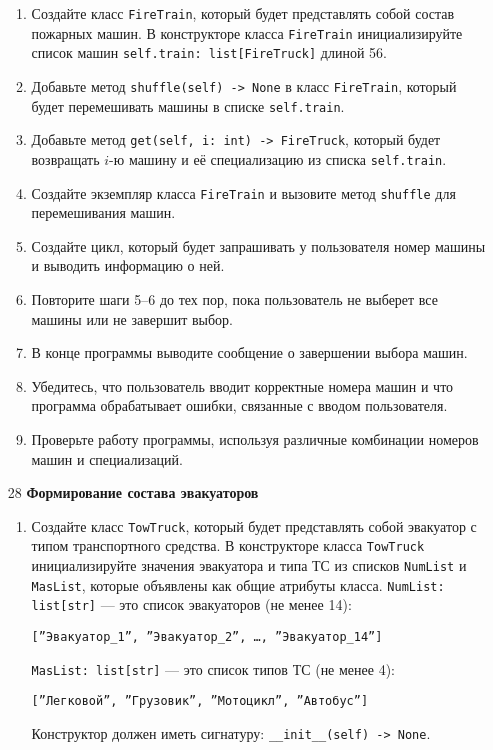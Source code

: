 \begin{enumerate}
\begin{enumerate}
    \item Создайте класс \texttt{FireTrain}, который будет представлять собой состав пожарных машин. В конструкторе класса \texttt{FireTrain} инициализируйте список машин \texttt{self.train: list[FireTruck]} длиной 56.

    \item Добавьте метод \texttt{shuffle(self) -> None} в класс \texttt{FireTrain}, который будет перемешивать машины в списке \texttt{self.train}.

    \item Добавьте метод \texttt{get(self, i: int) -> FireTruck}, который будет возвращать $i$-ю машину и её специализацию из списка \texttt{self.train}.

    \item Создайте экземпляр класса \texttt{FireTrain} и вызовите метод \texttt{shuffle} для перемешивания машин.

    \item Создайте цикл, который будет запрашивать у пользователя номер машины и выводить информацию о ней.

    \item Повторите шаги 5–6 до тех пор, пока пользователь не выберет все машины или не завершит выбор.

    \item В конце программы выводите сообщение о завершении выбора машин.

    \item Убедитесь, что пользователь вводит корректные номера машин и что программа обрабатывает ошибки, связанные с вводом пользователя.

    \item Проверьте работу программы, используя различные комбинации номеров машин и специализаций.
\end{enumerate}

\item[28] \textbf{Формирование состава эвакуаторов}
\begin{enumerate}
    \item Создайте класс \texttt{TowTruck}, который будет представлять собой эвакуатор с типом транспортного средства. В конструкторе класса \texttt{TowTruck} инициализируйте значения эвакуатора и типа ТС из списков \texttt{NumList} и \texttt{MasList}, которые объявлены как общие атрибуты класса. \texttt{NumList: list[str]} — это список эвакуаторов (не менее 14): 
    \begin{center}
        \texttt{[''Эвакуатор\_1'', ''Эвакуатор\_2'', \dots, ''Эвакуатор\_14'']}
    \end{center}
    \texttt{MasList: list[str]} — это список типов ТС (не менее 4):
    \begin{center}
        \texttt{[''Легковой'', ''Грузовик'', ''Мотоцикл'', ''Автобус'']}
    \end{center}
    Конструктор должен иметь сигнатуру: \texttt{\_\_init\_\_(self) -> None}.


\end{enumerate}
\end{enumerate}
